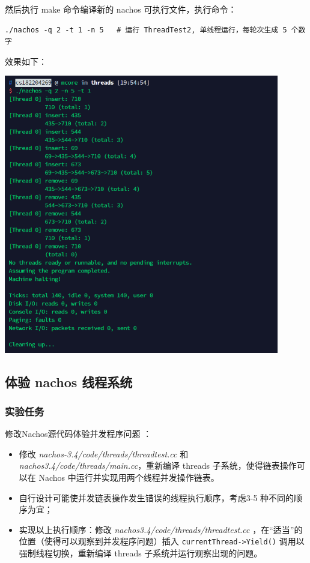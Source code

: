 \documentclass[a4paper,12pt]{article}
\begin{document}
\par 然后执行 make 命令编译新的 nachos 可执行文件，执行命令：

\begin{verbatim}
./nachos -q 2 -t 1 -n 5   # 运行 ThreadTest2, 单线程运行，每轮次生成 5 个数字
\end{verbatim}

\par 效果如下：
\begin{center}
    \includegraphics[width=12cm]{images/result/4.png}
\end{center}

\subsection{体验 nachos 线程系统}
\subsubsection{实验任务}
修改Nachos源代码体验并发程序问题 ：

\begin{itemize}
\item 修改 \textit{nachos-3.4/code/threads/threadtest.cc} 和 \textit{nachos3.4/code/threads/main.cc}，重新编译 threads 子系统，使得链表操作可以在 Nachos 中运行并实现用两个线程并发操作链表。 
\item 自行设计可能使并发链表操作发生错误的线程执行顺序，考虑3-5 种不同的顺序为宜； 
\item 实现以上执行顺序：修改 \textit{nachos3.4/code/threads/threadtest.cc} ，在“适当”的位置（使得可以观察到并发程序问题）插入 \texttt{currentThread->Yield()} 调用以强制线程切换，重新编译 threads 子系统并运行观察出现的问题。     
\end{itemize}
\end{document}
